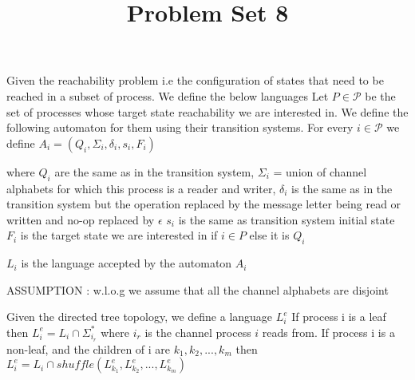 \documentclass{article}
\title{Problem Set 8}
\date{}
\begin{document}
\maketitle


Given the reachability problem i.e the configuration of states that need to be reached in a subset of process. We define the below languages
Let $P \in \mathscr{P}$ be the set of processes whose target state reachability we are interested in. 
We define the following automaton for them using their transition systems.
For every $i \in \mathscr{P}$ we define $A_i = (Q_i, \Sigma_i, \delta_i, s_i, F_i)$

where $Q_i$ are the same as in the transition system, $\Sigma_i$ = union of channel alphabets for which this process is a reader and writer,
$\delta_i$ is the same as in the transition system but the operation replaced by the message letter being read or written and no-op replaced by $\epsilon$ 
$s_i$ is the same as transition system initial state
$F_i$ is the target state we are interested in if $i \in P$ else it is $Q_i$

$L_i$ is the language accepted by the automaton $A_i$

ASSUMPTION : w.l.o.g we assume that all the channel alphabets are disjoint


Given the directed tree topology, we define a language $L_i^e$ 
If process i is a leaf then $L_i^e = L_i \cap \Sigma_{i_r}^*$ where $i_r$ is the channel process $i$ reads from.
If process i is a non-leaf, and the children of i are $k_1, k_2, ..., k_m$ then $L_i^e = L_i \cap shuffle(L_{k_1}^e, L_{k_2}^e, ..., L_{k_m}^e)$
\end{document}
